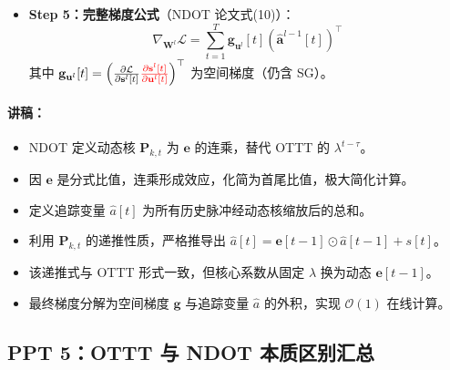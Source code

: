 \documentclass[journal,12pt,onecolumn]{IEEEtran}
\begin{document}
\begin{itemize}
    \item \textbf{Step 5：完整梯度公式}（NDOT 论文式(10)）：
    \[
    \boxed{
    \nabla_{\mathbf{W}^l} \mathcal{L}
    =
    \sum_{t=1}^{T}
    \mathbf{g}_{\mathbf{u}^l}[t]
    \left(
    \hat{\mathbf{a}}^{l-1}[t]
    \right)^{\top}
    }
    \]
    其中 \(\mathbf{g}_{\mathbf{u}^l}[t] = \left( \frac{\partial \mathcal{L}}{\partial \mathbf{s}^l[t]} {\color{red}{\frac{\partial \mathbf{s}^l[t]}{\partial \mathbf{u}^l[t]}}} \right)^{\top}\) 为空间梯度（仍含 SG）。
\end{itemize}

\paragraph{\textbf{讲稿：}}
\begin{itemize}
    \item NDOT 定义动态核 \(\mathbf{P}_{k,t}\) 为 \(\mathbf{e}\) 的连乘，替代 OTTT 的 \(\lambda^{t-\tau}\)。
    \item 因 \(\mathbf{e}\) 是分式比值，连乘形成效应，化简为首尾比值，极大简化计算。
    \item 定义追踪变量 \(\hat{a}[t]\) 为所有历史脉冲经动态核缩放后的总和。
    \item 利用 \(\mathbf{P}_{k,t}\) 的递推性质，严格推导出 \(\hat{a}[t] = \mathbf{e}[t-1] \odot \hat{a}[t-1] + s[t]\)。
    \item 该递推式与 OTTT 形式一致，但核心系数从固定 \(\lambda\) 换为动态 \(\mathbf{e}[t-1]\)。
    \item 最终梯度分解为空间梯度 \(\mathbf{g}\) 与追踪变量 \(\hat{a}\) 的外积，实现 \(\mathcal{O}(1)\) 在线计算。
\end{itemize}

\subsection*{PPT 5：OTTT 与 NDOT 本质区别汇总}
\end{document}
